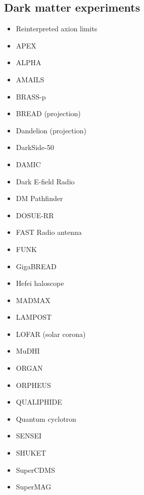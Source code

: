 \documentclass[8pt,twocolumn]{extarticle}
\begin{document}
\begin{mdframed}
\subsection*{Dark matter experiments}\vspace{-0.5em}
\begin{itemize}\setlength\itemsep{-0.5em}
\item Reinterpreted axion limits~\cite{Caputo:2021eaa}
\item APEX~\cite{He:2024ytp}
\item ALPHA~\cite{Millar:2022peq}
\item AMAILS~\cite{Jiang:2023jhl}
  \item BRASS-p~\cite{BRASS-p}
\item BREAD (projection)~\cite{Liu:2021pei}
\item Dandelion (projection)~\cite{Beaufort:2023qpd}
  \item DarkSide-50~\cite{DarkSide:2022knj}
\item DAMIC~\cite{Aguilar-Arevalo:2019wdi}
\item Dark E-field Radio~\cite{Godfrey:2021tvs,Levine:2024noa}
\item DM Pathfinder~\cite{Phipps:2019cqy}
\item DOSUE-RR~\cite{DOSUE-RR:2022ise,Adachi:2023wuo}
 \item FAST Radio antenna~\cite{An:2022hhb}
\item FUNK~\cite{Andrianavalomahefa:2020ucg}
\item GigaBREAD~\cite{Knirck:2023jpu}
\item Hefei haloscope~\cite{Kang:2024slu}
\item MADMAX~\cite{MADMAX:2024jnp}
\item LAMPOST~\cite{Chiles:2021gxk}
\item LOFAR (solar corona)~\cite{An:2023wij}
\item MuDHI~\cite{Manenti:2021whp}
\item ORGAN~\cite{McAllister:2022ibe,Quiskamp:2024oet}
\item ORPHEUS~\cite{Cervantes:2022yzp}
\item QUALIPHIDE~\cite{Ramanathan:2022egk}
\item Quantum cyclotron~\cite{Fan:2022uwu}
\item SENSEI~\cite{Barak:2020fql}
\item SHUKET~\cite{Brun:2019kak}
\item SuperCDMS~\cite{Aralis:2019nfa}
\item SuperMAG~\cite{Fedderke:2021rrm,Fedderke:2021aqo,Friel:2024shg}

\end{itemize}
\end{mdframed}
\end{document}

